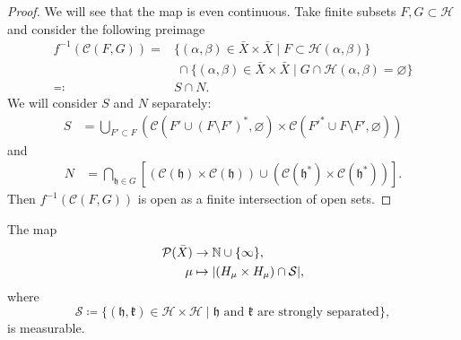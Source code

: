 \begin{proof}
  We will see that the map is even continuous. Take finite subsets \(F,G \subset \mathcal{H}\) and consider the following preimage
  \begin{align*}
    f^{-1}(\mathcal{C}(F, G))   = & \{(\alpha, \beta) \in \bar X \times \bar X \mid F \subset \mathcal{H}(\alpha, \beta) \}\\
    &\ \cap \{(\alpha, \beta) \in \bar X \times \bar X  \mid G \cap \mathcal{H}(\alpha, \beta) = \varnothing\}\\
                                 \eqqcolon & S \cap N.
  \end{align*}
  We will consider \(S\) and \(N\) separately:
  \begin{align*}
    S & = \bigcup_{F' \subset F} \left( \mathcal{C}(F' \cup (F \setminus F')^\ast, \varnothing) \times \mathcal{C}(F'^\ast  \cup F \setminus F', \varnothing) \right)
  \end{align*}
  and
  \begin{align*}
    N & = \bigcap_{\mathfrak{h} \in G}\left[(\mathcal{C}(\mathfrak{h}) \times \mathcal{C}(\mathfrak{h})) \cup (\mathcal{C}(\mathfrak{h}^\ast) \times \mathcal{C}(\mathfrak{h}^\ast))\right].
  \end{align*}
  Then \(f^{-1}(\mathcal{C}(F,G))\) is open as a finite intersection of open sets.
\end{proof}

\begin{lemma}
  \label{lem:measurable-str-sep}
  The map
  \begin{align*}
    \mathcal{P}(\bar X) & \to \mathbb{N} \cup \{\infty\},\\
    \mu & \mapsto |(H_\mu\times H_\mu) \cap \mathcal{S}|,
  \end{align*}
  where
  \[
    \mathcal{S}\coloneqq \{(\mathfrak{h},\mathfrak{k}) \in \mathcal{H} \times \mathcal{H} \mid \mathfrak{h} \text{ and } \mathfrak{k} \text{ are strongly separated}\},
  \]
  is measurable.
\end{lemma}


